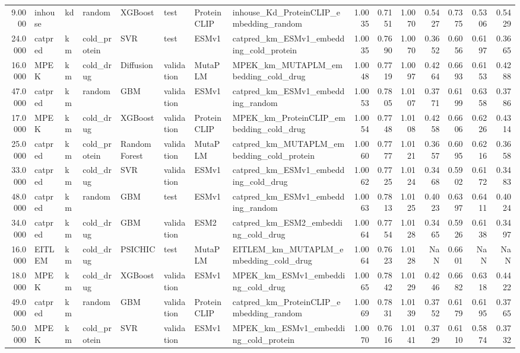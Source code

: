 \begin{tabular}{rlllllllrrrrrrr}
9.0000 & inhouse & kd & random & XGBoost & test & ProteinCLIP & inhouse_Kd_ProteinCLIP_embedding_random & 1.0035 & 0.7151 & 1.0070 & 0.5427 & 0.7375 & 0.5306 & 0.5429 \\
24.0000 & catpred & km & cold_protein & SVR & test & ESMv1 & catpred_km_ESMv1_embedding_cold_protein & 1.0035 & 0.7690 & 1.0070 & 0.3652 & 0.6056 & 0.6197 & 0.3665 \\
16.0000 & MPEK & km & cold_drug & Diffusion & validation & MutaPLM & MPEK_km_MUTAPLM_embedding_cold_drug & 1.0048 & 0.7719 & 1.0097 & 0.4264 & 0.6693 & 0.6153 & 0.4288 \\
47.0000 & catpred & km & random & GBM & validation & ESMv1 & catpred_km_ESMv1_embedding_random & 1.0053 & 0.7805 & 1.0107 & 0.3771 & 0.6199 & 0.6358 & 0.3786 \\
17.0000 & MPEK & km & cold_drug & XGBoost & validation & ProteinCLIP & MPEK_km_ProteinCLIP_embedding_cold_drug & 1.0054 & 0.7748 & 1.0108 & 0.4258 & 0.6606 & 0.6226 & 0.4314 \\
25.0000 & catpred & km & cold_protein & Random Forest & validation & MutaPLM & catpred_km_MUTAPLM_embedding_cold_protein & 1.0060 & 0.7777 & 1.0121 & 0.3657 & 0.6095 & 0.6216 & 0.3658 \\
33.0000 & catpred & km & cold_drug & SVR & validation & ESMv1 & catpred_km_ESMv1_embedding_cold_drug & 1.0062 & 0.7725 & 1.0124 & 0.3468 & 0.5902 & 0.6172 & 0.3483 \\
48.0000 & catpred & km & random & GBM & test & ESMv1 & catpred_km_ESMv1_embedding_random & 1.0063 & 0.7813 & 1.0125 & 0.4023 & 0.6397 & 0.6411 & 0.4024 \\
34.0000 & catpred & km & cold_drug & GBM & validation & ESM2 & catpred_km_ESM2_embedding_cold_drug & 1.0064 & 0.7754 & 1.0128 & 0.3465 & 0.5926 & 0.6138 & 0.3497 \\
16.0000 & EITLEM & km & cold_drug & PSICHIC & test & MutaPLM & EITLEM_km_MUTAPLM_embedding_cold_drug & 1.0064 & 0.7623 & 1.0128 & NaN & 0.6601 & NaN & NaN \\
18.0000 & MPEK & km & cold_drug & XGBoost & validation & ESMv1 & MPEK_km_ESMv1_embedding_cold_drug & 1.0065 & 0.7842 & 1.0129 & 0.4246 & 0.6682 & 0.6318 & 0.4422 \\
49.0000 & catpred & km & random & GBM & validation & ProteinCLIP & catpred_km_ProteinCLIP_embedding_random & 1.0069 & 0.7831 & 1.0139 & 0.3752 & 0.6179 & 0.6195 & 0.3765 \\
50.0000 & MPEK & km & cold_protein & SVR & validation & ESMv1 & MPEK_km_ESMv1_embedding_cold_protein & 1.0070 & 0.7616 & 1.0141 & 0.3729 & 0.6110 & 0.5874 & 0.3732 \\

\end{tabular}
